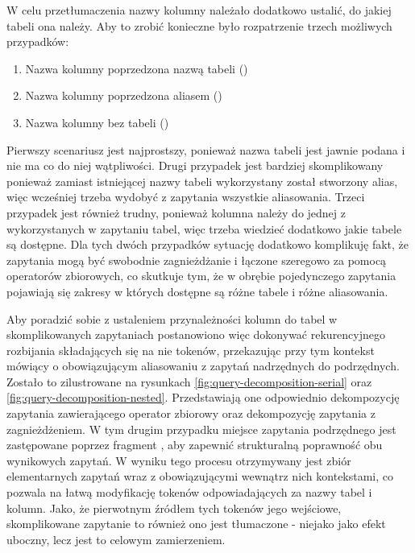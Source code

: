 W celu przetłumaczenia nazwy kolumny należało dodatkowo ustalić, do jakiej tabeli ona należy. Aby to zrobić konieczne było rozpatrzenie trzech możliwych przypadków:

\begin{enumerate}
    \item Nazwa kolumny poprzedzona nazwą tabeli ()
    \item Nazwa kolumny poprzedzona aliasem ()
    \item Nazwa kolumny bez tabeli ()
\end{enumerate}

Pierwszy scenariusz jest najprostszy, ponieważ nazwa tabeli jest jawnie podana i nie ma co do niej wątpliwości. Drugi przypadek jest bardziej skomplikowany ponieważ zamiast istniejącej nazwy tabeli wykorzystany został stworzony alias, więc wcześniej trzeba wydobyć z zapytania wszystkie aliasowania. Trzeci przypadek jest również trudny, ponieważ kolumna należy do jednej z wykorzystanych w zapytaniu tabel, więc trzeba wiedzieć dodatkowo jakie tabele są dostępne. Dla tych dwóch przypadków sytuację dodatkowo komplikuję fakt, że zapytania mogą być swobodnie zagnieżdżanie i łączone szeregowo za pomocą operatorów zbiorowych, co skutkuje tym, że w obrębie pojedynczego zapytania pojawiają się zakresy w których dostępne są różne tabele i różne aliasowania.

Aby poradzić sobie z ustaleniem przynależności kolumn do tabel w skomplikowanych zapytaniach postanowiono więc dokonywać rekurencyjnego rozbijania składających się na nie tokenów, przekazując przy tym kontekst mówiący o obowiązującym aliasowaniu z zapytań nadrzędnych do podrzędnych. Zostało to zilustrowane na rysunkach 
\ref{fig:query-decomposition-serial} oraz \ref{fig:query-decomposition-nested}. Przedstawiają one odpowiednio dekompozycję zapytania zawierającego operator zbiorowy oraz dekompozycję zapytania z zagnieżdżeniem. W tym drugim przypadku miejsce zapytania podrzędnego jest zastępowane poprzez fragment , aby zapewnić strukturalną poprawność obu wynikowych zapytań. W wyniku tego procesu otrzymywany jest zbiór elementarnych zapytań wraz z obowiązującymi wewnątrz nich kontekstami, co pozwala na łatwą modyfikację tokenów odpowiadających za nazwy tabel i kolumn. Jako, że pierwotnym źródłem tych tokenów jego wejściowe, skomplikowane zapytanie to również ono jest tłumaczone - niejako jako efekt uboczny, lecz jest to celowym zamierzeniem.

